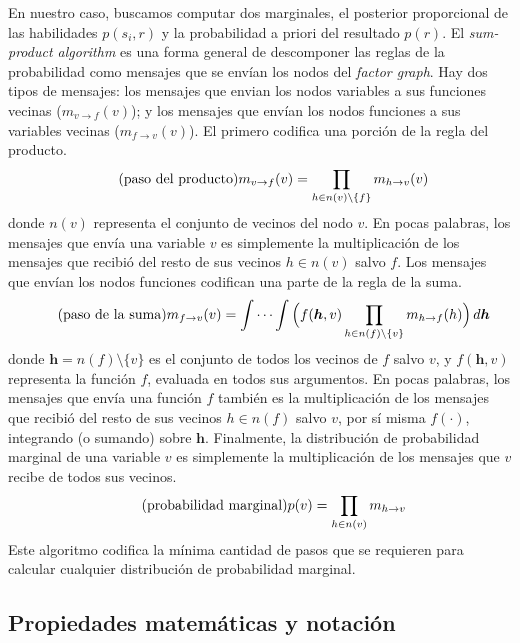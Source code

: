\documentclass[a4paper,11pt]{book}
\theoremstyle{definition}
\begin{document}
%
En nuestro caso, buscamos computar dos marginales, el posterior proporcional de las habilidades $p(s_i, r)$ y la probabilidad a priori del resultado $p(r)$.
%
El \emph{sum-product algorithm} es una forma general de descomponer las reglas de la probabilidad como mensajes que se env\'ian los nodos del \emph{factor graph}.
%
Hay dos tipos de mensajes: los mensajes que envian los nodos variables a sus funciones vecinas ($m_{v \rightarrow f}(v)$); y los mensajes que env\'ian los nodos funciones a sus variables vecinas ($m_{f \rightarrow v}(v)$).
%
El primero codifica una porci\'on de la regla del producto.
%
\begin{equation*}\label{eq:m_v_f} \tag{\text{paso del producto}}
m_{v \rightarrow f}(v) = \prod_{h \in n(v) \setminus \{f\} } m_{h \rightarrow v}(v)
\end{equation*}
%
donde $n(v)$ representa el conjunto de vecinos del nodo $v$.
%
En pocas palabras, los mensajes que env\'ia una variable $v$ es simplemente la multiplicaci\'on de los mensajes que recibi\'o del resto de sus vecinos $h \in n(v)$ salvo $f$.
%
Los mensajes que env\'ian los nodos funciones codifican una parte de la regla de la suma.
%
\begin{equation*}\label{eq:m_f_v}  \tag{\text{paso de la suma}}
m_{f \rightarrow v}(v) = \int \cdots \int \Big( f(\bm{h},v) \prod_{h \in n(f) \setminus \{v\} } m_{h \rightarrow f}(h) \Big) \,  d\bm{h}
\end{equation*}
%
donde $\bm{h} = n(f)\setminus \{v\}$ es el conjunto de todos los vecinos de $f$ salvo $v$, y $f(\bm{h},v)$ representa la funci\'on $f$, evaluada en todos sus argumentos.
%
En pocas palabras, los mensajes que env\'ia una funci\'on $f$ tambi\'en es la multiplicaci\'on de los mensajes que recibi\'o del resto de sus vecinos $h \in n(f)$ salvo $v$, por s\'i misma $f(\cdot)$, integrando (o sumando) sobre $\bm{h}$.
%
Finalmente, la distribuci\'on de probabilidad marginal de una variable $v$ es simplemente la multiplicaci\'on de los mensajes que $v$ recibe de todos sus vecinos.
%
\begin{equation*}\label{eq:marginal}  \tag{\text{probabilidad marginal}}
p(v) = \prod_{h \in n(v)} m_{h \rightarrow v}
\end{equation*}
%
Este algoritmo codifica la m\'inima cantidad de pasos que se requieren para calcular cualquier distribuci\'on de probabilidad marginal.

\subsection{Propiedades matem\'aticas y notaci\'on}\label{sec:propiedades}
\end{document}
